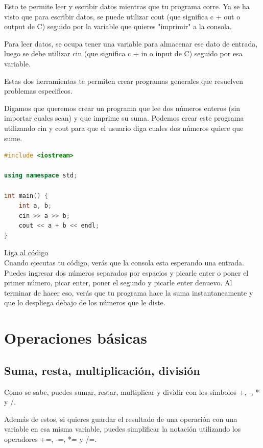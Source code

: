\documentclass{article}
\begin{document}
Esto te permite leer y escribir datos mientras que tu programa corre. Ya se ha visto que para escribir datos, se puede utilizar cout (que significa c + out o output de C) seguido por la variable que quieres "imprimir" a la consola.

Para leer datos, se ocupa tener una variable para almacenar ese dato de entrada, luego se debe utilizar cin (que significa c + in o input de C) seguido por esa variable.

Estas dos herramientas te permiten crear programas generales que resuelven problemas especificos.

Digamos que queremos crear un programa que lee dos números enteros (sin importar cuales sean) y que imprime su suma. Podemos crear este programa utilizando cin y cout para que el usuario diga cuales dos números quiere que sume.

\begin{lstlisting}[language=C++, caption=Suma]
#include <iostream>

using namespace std;

int main() {
    int a, b;
    cin >> a >> b;
    cout << a + b << endl;
}
\end{lstlisting}
\href{https://repl.it/@Jamesscn/Suma}{Liga al código}\\

Cuando ejecutas tu código, verás que la consola esta esperando una entrada. Puedes ingresar dos números separados por espacios y picarle enter o poner el primer número, picar enter, poner el segundo y picarle enter denuevo. Al terminar de hacer eso, verás que tu programa hace la suma instantaneamente y que lo despliega debajo de los números que le diste.

\section{Operaciones básicas}

\subsection{Suma, resta, multiplicación, división}

Como se sabe, puedes sumar, restar, multiplicar y dividir con los símbolos +, -, * y /.

Además de estos, si quieres guardar el resultado de una operación con una variable en esa misma variable, puedes simplificar la notación utilizando los operadores +=, -=, *= y /=.
\end{document}
